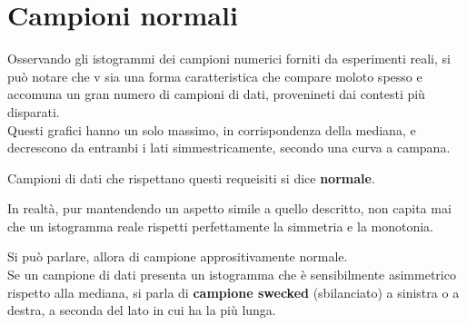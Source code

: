 \section{Campioni normali}
Osservando gli istogrammi dei campioni numerici forniti da esperimenti reali, si può notare che v sia una forma caratteristica che compare moloto spesso e accomuna un gran numero di campioni di dati, provenineti dai contesti più disparati.\\[0.2ex]
Questi grafici hanno un solo massimo, in corrispondenza della mediana, e decrescono da entrambi i lati simmestricamente, secondo una curva a campana.


Campioni di dati che rispettano questi requeisiti si dice \textbf{normale}.

\bigskip
In realtà, pur mantendendo un aspetto simile a quello descritto, non capita mai che un istogramma reale rispetti perfettamente la simmetria e la monotonia.


Si può parlare, allora di campione apprositivamente normale.\\
Se un campione di dati presenta un istogramma che è sensibilmente asimmetrico rispetto alla mediana, si parla di \textbf{campione swecked} (sbilanciato) a sinistra o a destra, a seconda del lato in cui ha la più lunga.
